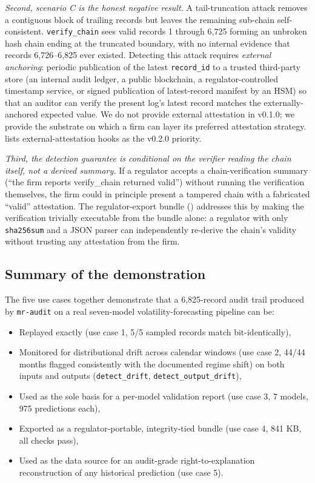 \textit{Second, scenario C is the honest negative result.} A tail-truncation attack removes a contiguous block of trailing records but leaves the remaining sub-chain self-consistent. \texttt{verify\_chain} sees valid records 1 through 6,725 forming an unbroken hash chain ending at the truncated boundary, with no internal evidence that records 6,726--6,825 ever existed. Detecting this attack requires \emph{external anchoring}: periodic publication of the latest \texttt{record\_id} to a trusted third-party store (an internal audit ledger, a public blockchain, a regulator-controlled timestamp service, or signed publication of latest-record manifest by an HSM) so that an auditor can verify the present log's latest record matches the externally-anchored expected value. We do not provide external attestation in v0.1.0; we provide the substrate on which a firm can layer its preferred attestation strategy.  lists external-attestation hooks as the v0.2.0 priority.

\textit{Third, the detection guarantee is conditional on the verifier reading the chain itself, not a derived summary.} If a regulator accepts a chain-verification summary (``the firm reports verify\_chain returned valid'') without running the verification themselves, the firm could in principle present a tampered chain with a fabricated ``valid'' attestation. The regulator-export bundle () addresses this by making the verification trivially executable from the bundle alone: a regulator with only \texttt{sha256sum} and a JSON parser can independently re-derive the chain's validity without trusting any attestation from the firm.

\subsection{Summary of the demonstration}\label{sec:demonstration_summary}

The five use cases together demonstrate that a 6,825-record audit trail produced by \texttt{mr-audit} on a real seven-model volatility-forecasting pipeline can be:

\begin{itemize}[leftmargin=*]
    \item Replayed exactly (use case 1, 5/5 sampled records match bit-identically),
    \item Monitored for distributional drift across calendar windows (use case 2, 44/44 months flagged consistently with the documented regime shift) on both inputs and outputs (\texttt{detect\_drift}, \texttt{detect\_output\_drift}),
    \item Used as the sole basis for a per-model validation report (use case 3, 7 models, 975 predictions each),
    \item Exported as a regulator-portable, integrity-tied bundle (use case 4, 841 KB, all checks pass),
    \item Used as the data source for an audit-grade right-to-explanation reconstruction of any historical prediction (use case 5).
\end{itemize}

